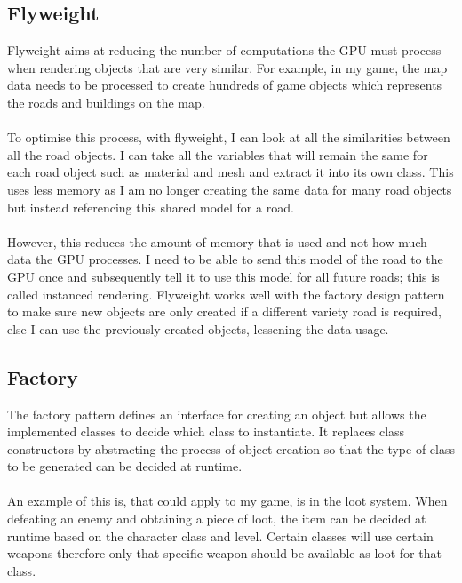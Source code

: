 \documentclass[a4paper]{report}
\begin{document}
\subsection{Flyweight}
Flyweight aims at reducing the number of computations the GPU must process when rendering objects that are very similar. For example, in my game, the map data needs to be processed to create hundreds of game objects which represents the roads and buildings on the map.
\\\\
To optimise this process, with flyweight, I can look at all the similarities between all the road objects. I can take all the variables that will remain the same for each road object such as material and mesh and extract it into its own class. This uses less memory as I am no longer creating the same data for many road objects but instead referencing this shared model for a road.
\\\\
However, this reduces the amount of memory that is used and not how much data the GPU processes. I need to be able to send this model of the road to the GPU once and subsequently tell it to use this model for all  future roads; this is called instanced rendering. Flyweight works well with the factory design pattern to make sure new objects are only created if a different variety road is required, else I can use the previously created objects, lessening the data usage. \cite{GPP}
\pagebreak
\subsection{Factory}
The factory pattern defines an interface for creating an object but allows the implemented classes to decide which class to instantiate. It replaces class constructors by abstracting the process of object creation so that the type of class to be generated can be decided at runtime. \cite{GOF}
\\\\
An example of this is, that could apply to my game, is in the loot system. When defeating an enemy and obtaining a piece of loot, the item can be decided at runtime based on the character class and level. Certain classes will use certain weapons therefore only that specific weapon should be available as loot for that class. \cite{Factory}
\end{document}
